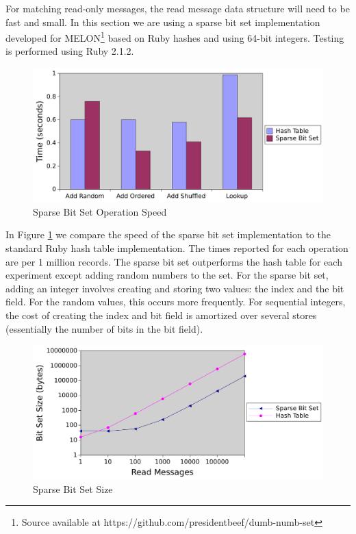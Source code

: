 For matching read-only messages, the read message data structure will need to be fast and small. In this section we are using a sparse bit set implementation developed for MELON\footnote{Source available at https://github.com/presidentbeef/dumb-numb-set} based on Ruby hashes and using 64-bit integers. Testing is performed using Ruby 2.1.2.

\begin{figure}
\centering
\includegraphics[width = \textwidth, scale = 0.75]{figures/bitset-speed.pdf}
\caption{Sparse Bit Set Operation Speed}
\label{fig:bitsetspeed}
\end{figure}

In Figure \ref{fig:bitsetspeed} we compare the speed of the sparse bit set implementation to the standard Ruby hash table implementation. The times reported for each operation are per 1 million records. The sparse bit set outperforms the hash table for each experiment except adding random numbers to the set. For the sparse bit set, adding an integer involves creating and storing two values: the index and the bit field. For the random values, this occurs more frequently. For sequential integers, the cost of creating the index and bit field is amortized over several stores (essentially the number of bits in the bit field).

\begin{figure}
\centering
\includegraphics[width = \textwidth, scale = 0.80]{figures/bitset-size.pdf}
\caption{Sparse Bit Set Size}
\label{fig:bitsetsize}
\end{figure}

